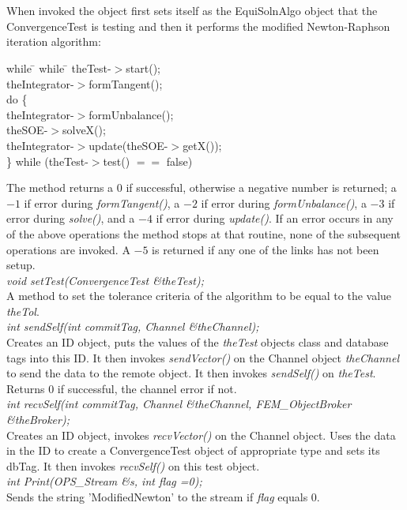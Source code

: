   \\
 \\
When invoked the object first sets itself as the EquiSolnAlgo object
that the ConvergenceTest is testing and then it performs the
modified Newton-Raphson iteration algorithm: 
\begin{tabbing}
while \= \+ while \= \kill
theTest-$>$start(); \\
theIntegrator-$>$formTangent(); \\
do \{ \+ \\
theIntegrator-$>$formUnbalance(); \\
theSOE-$>$solveX(); \\
theIntegrator-$>$update(theSOE-$>$getX()); \- \\
\} while (theTest-$>$test() $==$ false)\- \\
\end{tabbing}


\noindent The method returns a 0 if successful, otherwise a negative number is
returned; a $-1$ if error during {\em formTangent()}, a $-2$ if
error during {\em formUnbalance()}, a $-3$ if error during {\em
solve()}, and a $-4$ if error during {\em update()}.
If an error occurs in any of the above operations the method stops at
that routine, none of the subsequent operations are invoked. A $-5$ is
returned if any one of the links has not been setup.\\

{\em void setTest(ConvergenceTest \&theTest);} \\
A method to set the tolerance criteria of the algorithm to be equal to
the value {\em theTol}. \\

{\em int sendSelf(int commitTag, Channel \&theChannel);}\\
Creates an ID object, puts the values of the {\em theTest} objects
class and database tags into this ID.
It then invokes {\em sendVector()} on the Channel object {\em
theChannel} to send the data to the remote object. It then invokes
{\em sendSelf()} on {\em theTest}. Returns $0$ if successful, the
 channel error if not. \\

{\em int recvSelf(int commitTag, Channel \&theChannel, FEM\_ObjectBroker
\&theBroker);}\\ 
Creates an ID object, invokes {\em recvVector()} on the Channel
object. Uses the data in the ID to create a ConvergenceTest object of
appropriate type and sets its dbTag. It then invokes {\em recvSelf()}
on this test object.  \\

{\em int Print(OPS_Stream \&s, int flag =0);} \\
Sends the string 'ModifiedNewton' to the stream if {\em flag} equals $0$.
